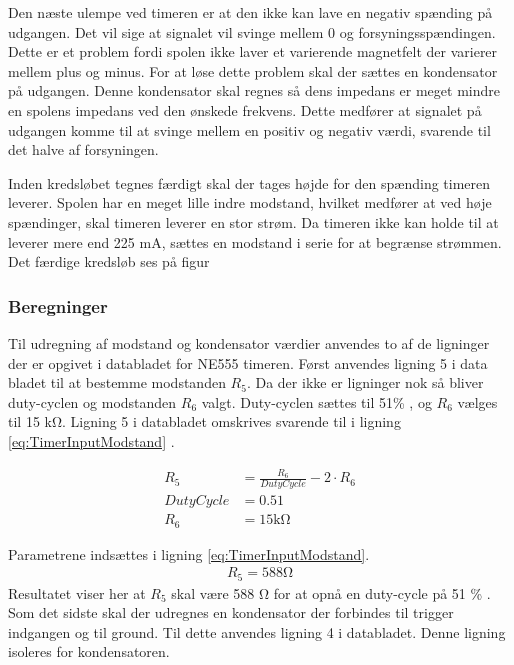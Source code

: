 Den næste ulempe ved timeren er at den ikke kan lave en negativ spænding på udgangen. 
Det vil sige at signalet vil svinge mellem 0 og forsyningsspændingen. 
Dette er et problem fordi spolen ikke laver et varierende magnetfelt der varierer mellem plus og minus. For at løse dette problem skal der sættes en kondensator på udgangen. 
Denne kondensator skal regnes så dens impedans er meget mindre en spolens impedans ved den ønskede frekvens. 
Dette medfører at signalet på udgangen komme til at svinge mellem en positiv og negativ værdi, svarende til det halve af forsyningen.

Inden kredsløbet tegnes færdigt skal der tages højde for den spænding timeren leverer. 
Spolen har en meget lille indre modstand, hvilket medfører at ved høje spændinger, skal timeren leverer en stor strøm. 
Da timeren ikke kan holde til at leverer mere end 225 \si{\milli\ampere}, sættes en modstand i serie for at begrænse strømmen. 
Det færdige kredsløb ses på figur 

\subsubsection{Beregninger}
Til udregning af modstand og kondensator værdier anvendes to af de ligninger der er opgivet i databladet for NE555 timeren. 
Først anvendes ligning 5 i data bladet til at bestemme modstanden $R_5$. 
Da der ikke er ligninger nok så bliver duty-cyclen og modstanden $R_6$ valgt. 
Duty-cyclen sættes til 51\%  , og $R_6$ vælges til 15 \si{\kilo\ohm}. 
Ligning 5 i databladet omskrives svarende til i ligning \ref{eq:TimerInputModstand} .

\begin{align}
R_5 & = \frac{R_6}{DutyCycle} - 2 \cdot R_6 \label{eq:TimerInputModstand} \\
DutyCycle & = 0.51 \nonumber \\
R_6 & = 15 \si{\kilo \ohm} \nonumber
\end{align}

Parametrene indsættes i ligning \ref{eq:TimerInputModstand}.
\begin{align}
R_5 = 588 \si{\ohm} \label{eq:InputBeregnet}
\end{align}
Resultatet viser her at $R_5$ skal være 588 \si{\ohm}  for at opnå en duty-cycle på 51 \% .
Som det sidste skal der udregnes en kondensator der forbindes til trigger indgangen og til ground. 
Til dette anvendes ligning 4 i databladet. Denne ligning isoleres for kondensatoren.

